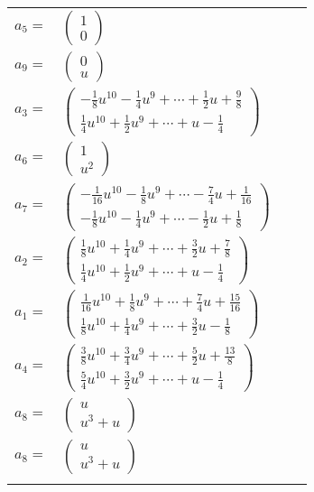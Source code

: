 \documentclass[1p]{elsarticle_modified}
\theoremstyle{definition}
\begin{document}
\begin{tabular}{m{7pt} m{180pt} m{7pt} m{180pt} }
\flushright $a_{5}=$&$\begin{pmatrix}1\\0\end{pmatrix}$ \\
\flushright $a_{9}=$&$\begin{pmatrix}0\\u\end{pmatrix}$ \\
\flushright $a_{3}=$&$\begin{pmatrix}-\frac{1}{8} u^{10}-\frac{1}{4} u^9+\cdots+\frac{1}{2} u+\frac{9}{8}\\\frac{1}{4} u^{10}+\frac{1}{2} u^9+\cdots+u-\frac{1}{4}\end{pmatrix}$ \\
\flushright $a_{6}=$&$\begin{pmatrix}1\\u^2\end{pmatrix}$ \\
\flushright $a_{7}=$&$\begin{pmatrix}-\frac{1}{16} u^{10}-\frac{1}{8} u^9+\cdots-\frac{7}{4} u+\frac{1}{16}\\-\frac{1}{8} u^{10}-\frac{1}{4} u^9+\cdots-\frac{1}{2} u+\frac{1}{8}\end{pmatrix}$ \\
\flushright $a_{2}=$&$\begin{pmatrix}\frac{1}{8} u^{10}+\frac{1}{4} u^9+\cdots+\frac{3}{2} u+\frac{7}{8}\\\frac{1}{4} u^{10}+\frac{1}{2} u^9+\cdots+u-\frac{1}{4}\end{pmatrix}$ \\
\flushright $a_{1}=$&$\begin{pmatrix}\frac{1}{16} u^{10}+\frac{1}{8} u^9+\cdots+\frac{7}{4} u+\frac{15}{16}\\\frac{1}{8} u^{10}+\frac{1}{4} u^9+\cdots+\frac{3}{2} u-\frac{1}{8}\end{pmatrix}$ \\
\flushright $a_{4}=$&$\begin{pmatrix}\frac{3}{8} u^{10}+\frac{3}{4} u^9+\cdots+\frac{5}{2} u+\frac{13}{8}\\\frac{5}{4} u^{10}+\frac{3}{2} u^9+\cdots+u-\frac{1}{4}\end{pmatrix}$ \\
\flushright $a_{8}=$&$\begin{pmatrix}u\\u^3+u\end{pmatrix}$\\ \flushright $a_{8}=$&$\begin{pmatrix}u\\u^3+u\end{pmatrix}$\\&\end{tabular}
\end{document}
